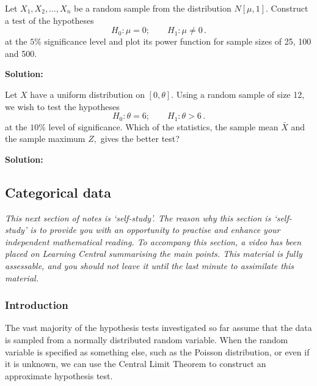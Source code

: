 \documentclass[12pt]{article}
\newenvironment{example}[1][Example:]{\begin{trivlist}
\item[\hskip \labelsep {\bfseries #1}]}{\end{trivlist}}
\begin{document}
\begin{example}
Let $X_{1},X_{2},\ldots,X_{n}$ be a random sample from the distribution $N[\mu,1].$ Construct a test of the hypotheses $$
H_{0}: \mu=0; \qquad H_{1}: \mu \neq 0\,.
$$
at the $5\%$ significance level and plot its power function for sample sizes of 25, 100 and 500.
\end{example}

\begin{mdframed}
\bf{Solution:}
\textcolor[rgb]{1.00,1.00,1.00}{\lipsum[1-6]}
\end{mdframed}

\begin{example}
Let $X$ have a uniform distribution on $[0,\theta]$. Using a random sample of size 12, we wish to test the hypotheses
$$
H_{0}: \theta=6; \qquad H_{1}: \theta>6\,.
$$
at the $10\%$ level of significance. Which of the statistics, the sample mean $\bar{X}$ and the sample maximum $Z,$ gives the better test?
\end{example}
\begin{mdframed}
\bf{Solution:}
\textcolor[rgb]{1.00,1.00,1.00}{\lipsum[1-7]}
\end{mdframed}




\subsection{Categorical data}
\begin{mdframed}
{\it This next section of notes is `self-study'. The reason why this section is `self-study' is to provide you with an opportunity to practise and enhance your independent mathematical reading. To accompany this section, a video has been placed on Learning Central summarising the main points. This material is fully assessable, and you should not leave it until the last minute to assimilate this material. }
\end{mdframed}

\subsubsection{Introduction}

The vast majority of the hypothesis tests investigated so far assume that the data is sampled from a normally distributed random variable. When the random variable is specified as something else, such as the Poisson distribution, or even if it is unknown, we can use the Central Limit Theorem to construct an approximate hypothesis test.
\end{document}
